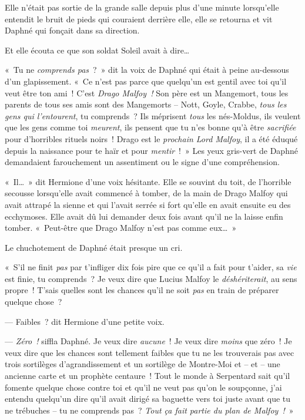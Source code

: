 Elle n'était pas sortie de la grande salle depuis plus d'une minute lorsqu'elle entendit le bruit de pieds qui couraient derrière elle, elle se retourna et vit Daphné qui fonçait dans sa direction.

Et elle écouta ce que son soldat Soleil avait à dire…

«~Tu ne \emph{comprends pas}~?~» dit la voix de Daphné qui était à peine au-dessous d'un glapissement. «~Ce n'est pas parce que quelqu'un est gentil avec toi qu'il veut être ton ami~! C'est \emph{Drago Malfoy~!} Son père est un Mangemort, tous les parents de tous ses amis sont des Mangemorts -- Nott, Goyle, Crabbe, \emph{tous les gens qui l'entourent}, tu comprends~? Ils méprisent \emph{tous} les nés-Moldus, ils veulent que les gens comme toi \emph{meurent}, ils pensent que tu n'es bonne qu'à être \emph{sacrifiée} pour d'horribles rituels noirs~! Drago est le \emph{prochain Lord Malfoy}, il a été éduqué depuis la naissance pour te haïr et pour \emph{mentir}~!~» Les yeux gris-vert de Daphné demandaient farouchement un assentiment ou le signe d'une compréhension.

«~Il…~» dit Hermione d'une voix hésitante. Elle se souvint du toit, de l'horrible secousse lorsqu'elle avait commencé à tomber, de la main de Drago Malfoy qui avait attrapé la sienne et qui l'avait serrée si fort qu'elle en avait ensuite eu des ecchymoses. Elle avait dû lui demander deux fois avant qu'il ne la laisse enfin tomber. «~Peut-être que Drago Malfoy n'est pas comme eux…~»

Le chuchotement de Daphné était presque un cri.

«~S'il ne finit \emph{pas} par t'infliger dix fois pire que ce qu'il a fait pour t'aider, sa \emph{vie} est finie, tu comprends~? Je veux dire que Lucius Malfoy le \emph{déshériterait}, au sens propre~! T'sais quelles sont les chances qu'il ne soit \emph{pas} en train de préparer quelque chose~?

--- Faibles~? dit Hermione d'une petite voix.

--- \emph{Zéro~!} siffla Daphné. Je veux dire \emph{aucune}~! Je veux dire \emph{moins} que zéro~! Je veux dire que les chances sont tellement faibles que tu ne les trouverais pas avec trois sortilèges d'agrandissement et un sortilège de Montre-Moi et -- et -- une ancienne carte et un prophète centaure~! Tout le monde à Serpentard sait qu'il fomente quelque chose contre toi et qu'il ne veut pas qu'on le soupçonne, j'ai entendu quelqu'un dire qu'il avait dirigé sa baguette vers toi juste avant que tu ne trébuches -- tu ne comprends pas~? \emph{Tout ça fait partie du plan de Malfoy~!}~»

